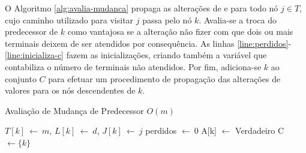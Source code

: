 O  Algoritmo  \ref{alg:avalia-mudanca}  propaga  as  alterações  de  {\delay}  e
{\jitter} para todo nó $j \in T$,  cujo caminho utilizado para visitar $j$ passa
pelo  nó $k$.  Avalia-se a  troca  do predecessor  de  $k$ como  vantajosa se  a
alteração não fizer com  que dois ou mais terminais deixem  de ser atendidos por
consequência. As linhas \eqref{line:perdidos}-\eqref{line:inicializa-c} fazem as
inicializações, criando também a variável  que contabiliza o número de terminais
não  atendidos.  Por fim,  adiciona-se  $k$  ao  conjunto  $C$ para  efetuar  um
procedimento de propagação das alterações de valores para os nós descendentes de
$k$.

\begin{algorithm}[!ht]
  \caption{Avaliação de Mudança de Predecessor $O(m)$ \label{alg:avalia-mudanca}}
  $T[k] \ \leftarrow \ m$, $L[k] \ \leftarrow \ d$, $J[k] \ \leftarrow \ j$\;
  perdidos $\leftarrow \ 0$\; \label{line:perdidos}
  A[k] $\leftarrow$ Verdadeiro\;
  C $\leftarrow \{k\}$\; \label{line:inicializa-c}

  \;  
\end{algorithm}

